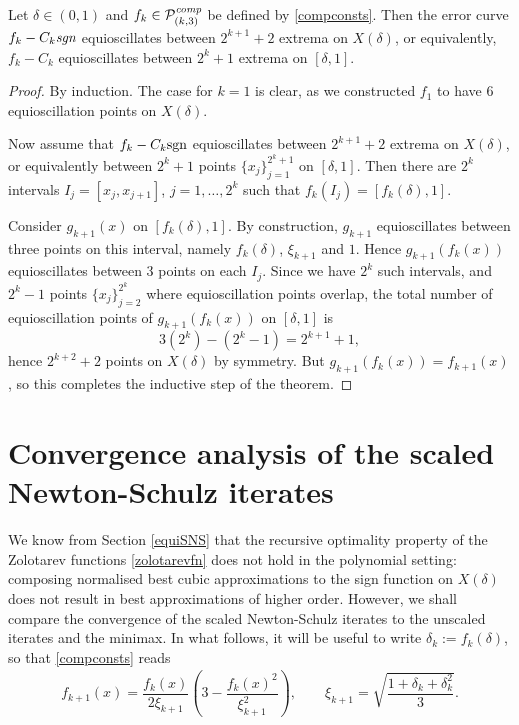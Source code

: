 \begin{lemma}\label{equio}
Let $\delta \in (0,1)$ and $f_k \in \mathcal{P}_{(k,3)}^{\emph{comp}}$ be defined by \eqref{compconsts}. Then the error curve $f_k-C_k\emph{\text{sgn}}$ equioscillates between $2^{k+1}+2$ extrema on $X(\delta)$, or equivalently, $f_k-C_k$ equioscillates between $2^{k}+1$ extrema on $[\delta,1]$.
\end{lemma}

\begin{proof}
By induction. The case for $k=1$ is clear, as we constructed $f_1$ to have 6 equioscillation points on $X(\delta)$. 

\bigskip{}

Now assume that $f_k-C_k \text{sgn}$ equioscillates between $2^{k+1}+2$ extrema on $X(\delta)$, or equivalently between $2^k+1$ points $\{x_j\}_{j=1}^{2^k+1}$ on $[\delta,1]$. Then there are $2^k$ intervals $I_j=[x_j,x_{j+1}]$, $j=1,\dots,2^k$ such that $f_k(I_j)=[f_k(\delta),1]$.

\bigskip{}

Consider $g_{k+1}(x)$ on $[f_k(\delta),1]$. By construction, $g_{k+1}$ equioscillates between three points on this interval, namely $f_k(\delta)$, $\xi_{k+1}$ and $1$. Hence $g_{k+1}(f_k(x))$ equioscillates between 3 points on each $I_j$. Since we have $2^k$ such intervals, and $2^k-1$ points $\{x_j\}_{j=2}^{2^k}$ where equioscillation points overlap, the total number of equioscillation points of $g_{k+1}(f_k(x))$ on $[\delta,1]$ is
\[3(2^k) - (2^k-1)=2^{k+1}+1,\]
hence $2^{k+2}+2$ points on $X(\delta)$ by symmetry. But $g_{k+1}(f_k(x))=f_{k+1}(x)$, so this completes the inductive step of the theorem.
\end{proof}

\section{Convergence analysis of the scaled Newton-Schulz iterates}

We know from Section \ref{equiSNS} that the recursive optimality property of the Zolotarev functions \eqref{zolotarevfn} does not hold in the polynomial setting: composing normalised best cubic approximations to the sign function on $X(\delta)$ does not result in best approximations of higher order. However, we shall compare the convergence of the scaled Newton-Schulz iterates to the unscaled iterates and the minimax. In what follows, it will be useful to write $\delta_k:=f_k(\delta)$, so that \eqref{compconsts} reads
\begin{align}
    f_{k+1}(x) =\dfrac{f_k(x)}{2\xi_{k+1}}\left(3-\dfrac{f_k(x)^2}{\xi_{k+1}^2}\right), \qquad \xi_{k+1}=\sqrt{\dfrac{1+\delta_k+\delta_k^2}{3}}. \label{deltak}
\end{align}

